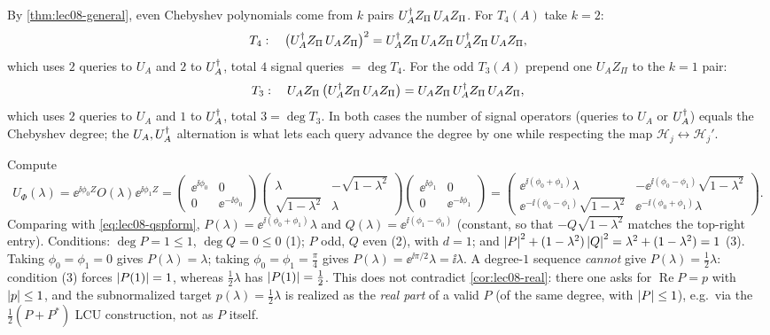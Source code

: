 \begin{solution}
By \cref{thm:lec08-general}, even Chebyshev polynomials come from $k$ pairs
$U_A^{\dagger} Z_\Pi\,U_A Z_\Pi$. For $T_4(A)$ take $k=2$:
\[
  T_4:\quad \bigl(U_A^{\dagger} Z_\Pi\,U_A Z_\Pi\bigr)^2
   =U_A^{\dagger} Z_\Pi\,U_A Z_\Pi\,U_A^{\dagger} Z_\Pi\,U_A Z_\Pi,
\]
which uses $2$ queries to $U_A$ and $2$ to $U_A^{\dagger}$, total $4$ signal queries
$=\deg T_4$. For the odd $T_3(A)$ prepend one $U_A Z_\Pi$ to the $k=1$ pair:
\[
  T_3:\quad U_A Z_\Pi\,\bigl(U_A^{\dagger} Z_\Pi\,U_A Z_\Pi\bigr)
   =U_A Z_\Pi\,U_A^{\dagger} Z_\Pi\,U_A Z_\Pi,
\]
which uses $2$ queries to $U_A$ and $1$ to $U_A^{\dagger}$, total $3=\deg T_3$. In both
cases the number of signal operators (queries to $U_A$ or $U_A^{\dagger}$) equals the
Chebyshev degree; the $U_A,U_A^{\dagger}$ alternation is what lets each query advance the
degree by one while respecting the map $\mathcal H_j\leftrightarrow\mathcal H_j'$.
\end{solution}

\begin{solution}
Compute
\[
  U_\Phi(\lambda)=\ee^{\ii\phi_0 Z}O(\lambda)\ee^{\ii\phi_1 Z}
  =\begin{pmatrix}\ee^{\ii\phi_0}&0\\0&\ee^{-\ii\phi_0}\end{pmatrix}
   \begin{pmatrix}\lambda&-\sqrt{1-\lambda^2}\\ \sqrt{1-\lambda^2}&\lambda\end{pmatrix}
   \begin{pmatrix}\ee^{\ii\phi_1}&0\\0&\ee^{-\ii\phi_1}\end{pmatrix}
  =\begin{pmatrix}\ee^{\ii(\phi_0+\phi_1)}\lambda & -\ee^{\ii(\phi_0-\phi_1)}\sqrt{1-\lambda^2}\\[3pt]
    \ee^{-\ii(\phi_0-\phi_1)}\sqrt{1-\lambda^2}&\ee^{-\ii(\phi_0+\phi_1)}\lambda\end{pmatrix}.
\]
Comparing with \eqref{eq:lec08-qspform}, $P(\lambda)=\ee^{\ii(\phi_0+\phi_1)}\lambda$
and $Q(\lambda)=\ee^{\ii(\phi_1-\phi_0)}$ (constant, so that
$-Q\sqrt{1-\lambda^2}$ matches the top-right entry). Conditions:
$\deg P=1\le1$, $\deg Q=0\le0$ (1); $P$ odd, $Q$ even (2), with $d=1$; and
$\left\lvert P \right\rvert^2+(1-\lambda^2)\left\lvert Q \right\rvert^2=\lambda^2+(1-\lambda^2)=1$ (3). Taking
$\phi_0=\phi_1=0$ gives $P(\lambda)=\lambda$; taking
$\phi_0=\phi_1=\tfrac\pi4$ gives $P(\lambda)=\ee^{\ii\pi/2}\lambda=\ii\lambda$. A
degree-$1$ sequence \emph{cannot} give $P(\lambda)=\tfrac12\lambda$: condition (3)
forces $\left\lvert P(1) \right\rvert=1$, whereas $\tfrac12\lambda$ has $\left\lvert P(1) \right\rvert=\tfrac12$. This does
not contradict \cref{cor:lec08-real}: there one asks for $\operatorname{Re}P=p$ with
$\left\lvert p \right\rvert\le1$, and the subnormalized target $p(\lambda)=\tfrac12\lambda$ is realized
as the \emph{real part} of a valid $P$ (of the same degree, with $\left\lvert P \right\rvert\le1$),
e.g.\ via the $\tfrac12(P+P^*)$ LCU construction, not as $P$ itself.
\end{solution}

